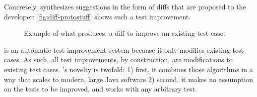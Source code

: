 Concretely, \dspot synthesizes suggestions in the form of diffs that are proposed to the developer: \autoref{fig:diff-protostuff} shows such a test improvement.  

\begin{figure}[!ht]
	\centering{}
	\caption{Example of what \dspot produces: a diff to improve an existing test case.}
	\label{fig:diff-protostuff}
\end{figure}

\dspot is an automatic test improvement system because it only modifies existing test cases. As such, all test improvements, by construction, are modifications to existing test cases.
\dspot's novelty is twofold: 1) first, it combines those algorithms in a way that scales to modern, large Java software 2) second, it makes no assumption on the tests to be improved, and works with any arbitrary \junit test.


